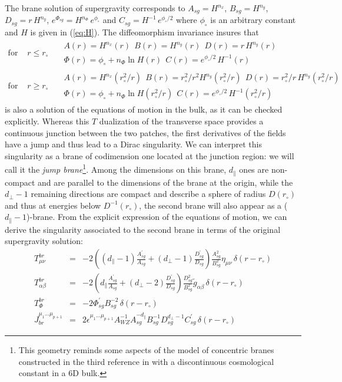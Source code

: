 \documentclass[a4paper,12pt]{article}
\def\dpar{d_{\scriptscriptstyle\parallel}}
\def\dperp{d_{\scriptscriptstyle\perp}}
\begin{document}
The brane solution of supergravity corresponds to
$A_{sg}=H^{n_x}$, $B_{sg}=H^{n_y}$, $D_{sg}=r\, H^{n_y}$,
$e^{\Phi_{sg}}=H^{n_\Phi}\, e^{\phi_\circ}$
and $C_{sg}=H^{-1}\, e^{\phi_\circ/2}$ where $\phi_\circ$ is an arbitrary
constant and $H$ is given in (\ref{eq:H}).
The diffeomorphism invariance insures that
%
\begin{eqnarray}
%
\mbox{for } & r\leq r_\circ & \ \ \
\begin{array}{l}
A(r) = H^{n_x} (r) \ \
B(r) = H^{n_y} (r) \ \
D (r) = r\, H^{n_y} (r)
\\
\Phi (r) = \phi_\circ + n_\Phi \ln H (r) \ \
C (r) = e^{\phi_\circ/2}\, H^{-1} (r)
\end{array}
\\
%
\mbox{for } & r\geq r_\circ & \ \ \
\begin{array}{l}
A(r) = H^{n_x} (r_\circ^2/r) \ \
B(r) = r_\circ^2/r^2 H^{n_y} (r_\circ^2/r)  \ \
D (r) = r_\circ^2/r\, H^{n_y} (r_\circ^2/r)
\\
\Phi (r) = \phi_\circ + n_\Phi \ln H (r_\circ^2/r) \ \
C (r) = e^{\phi_\circ/2}\, H^{-1} (r_\circ^2/r)
\end{array}
\end{eqnarray}
%
is also a solution of the equations of motion in the bulk, as it can be checked
explicitly. Whereas this $T$ dualization of the transverse space provides a
continuous junction between the two patches, the first derivatives of the fields
have a jump and thus lead to a Dirac singularity. We can interpret this singularity
as a brane of codimension one located at the junction region: we will call it the
{\it jump brane}\footnote{This geometry reminds some aspects of the model
of concentric branes constructed in the third reference in \cite{TwoExtra} with
a discontinuous cosmological constant in a 6D bulk.}. Among the dimensions
on this brane, $\dpar$ ones are non-compact and are parallel to the dimensions
of the brane at the origin, while the $\dperp-1$ remaining directions
are compact and describe a sphere of radius $D(r_\circ)$ and thus at energies
below $D^{-1}(r_\circ)$, the second brane will also appear as a ($\dpar-1$)-brane.
From the explicit expression of the equations of motion, we can derive the
singularity associated to the second brane in terms of the original supergravity
solution:
%
\begin{eqnarray}
%
	\label{eq:2ndTmunu}
T_{\mu\nu}^{br} & = &
-2\left( (\dpar-1) \frac{A^\prime_{sg}}{A_{sg}}
+(\dperp-1) \frac{D^\prime_{sg}}{D_{sg}} \right)
\frac{A^2_{sg}}{B^2_{sg}} \eta_{\mu\nu} \, \delta (r-r_\circ)
\\
%
	\label{eq:2ndTab}
T_{\alpha\beta}^{br} & = &
-2\left( \dpar \frac{A^\prime_{sg}}{A_{sg}}
+(\dperp-2) \frac{D^\prime_{sg}}{D_{sg}} \right)
\frac{D^2_{sg}}{B^2_{sg}} {\tilde g}_{\alpha\beta} \, \delta (r-r_\circ)
\\
%
	\label{eq:2ndTphi}
T_{\Phi}^{br} & = &
-2 \Phi_{sg}^\prime B_{sg}^{-2} \, \delta (r-r_\circ)
\\
%
	\label{eq:2ndJ}
J^{\mu_1\ldots\mu_{p+1}}_{br} & = &
2 \epsilon^{\mu_1\ldots\mu_{p+1}} A_{WZ}^{-1} A_{sg}^{-\dpar}
B_{sg}^{-1} D_{sg}^{\dperp-1} C_{sg}^\prime  \, \delta (r-r_\circ)
\end{eqnarray}
\end{document}
